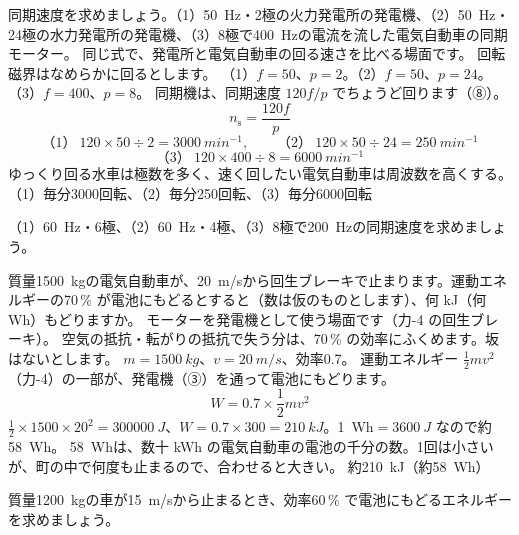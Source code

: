 \label{ph:電-12:ex10}
\begin{phreidai}
同期速度を求めましょう。（1）\qty{50}{Hz}・2極の火力発電所の発電機、（2）\qty{50}{Hz}・24極の水力発電所の発電機、（3）8極で\qty{400}{Hz}の電流を流した電気自動車の同期モーター。
\phbamen
同じ式で、発電所と電気自動車の回る速さを比べる場面です。
\phmushi
回転磁界はなめらかに回るとします。
\phzu
（1）$f=50$、$p=2$。（2）$f=50$、$p=24$。（3）$f=400$、$p=8$。
\phriyu
同期機は、同期速度 $120f/p$ でちょうど回ります（⑧）。
\phtateru
\[n_{\mathrm s}=\frac{120f}{p}\]
\phtoku
\[\text{（1）}\ 120\times50\div2=\qty{3000}{min^{-1}},\qquad\text{（2）}\ 120\times50\div24=\qty{250}{min^{-1}}\]
\[\text{（3）}\ 120\times400\div8=\qty{6000}{min^{-1}}\]
\phtashikame
ゆっくり回る水車は極数を多く、速く回したい電気自動車は周波数を高くする。
\kotae （1）毎分3000回転、（2）毎分250回転、（3）毎分6000回転
\end{phreidai}
\begin{jibun}
（1）\qty{60}{Hz}・6極、（2）\qty{60}{Hz}・4極、（3）8極で\qty{200}{Hz}の同期速度を求めましょう。
\end{jibun}

\label{ph:電-12:ex11}
\begin{phreidai}[回生ブレーキで電池にもどす]
質量\qty{1500}{kg}の電気自動車が、\qty{20}{m/s}から回生ブレーキで止まります。運動エネルギーの70\,\% が電池にもどるとすると（数は仮のものとします）、何 kJ（何 Wh）もどりますか。
\phbamen
モーターを発電機として使う場面です（力-4 の回生ブレーキ）。
\phmushi
空気の抵抗・転がりの抵抗で失う分は、70\,\% の効率にふくめます。坂はないとします。
\phzu
$m=\qty{1500}{kg}$、$v=\qty{20}{m/s}$、効率0.7。
\phriyu
運動エネルギー $\tfrac12mv^2$（力-4）の一部が、発電機（③）を通って電池にもどります。
\phtateru
\[W=0.7\times\frac12mv^2\]
\phtoku
$\tfrac12\times1500\times20^2=\qty{300000}{J}$、$W=0.7\times300=\qty{210}{kJ}$。\qty{1}{Wh}$=\qty{3600}{J}$ なので約\qty{58}{Wh}。
\phtashikame
\qty{58}{Wh}は、数十 kWh の電気自動車の電池の千分の数。1回は小さいが、町の中で何度も止まるので、合わせると大きい。
\kotae 約\qty{210}{kJ}（約\qty{58}{Wh}）
\end{phreidai}
\begin{jibun}
質量\qty{1200}{kg}の車が\qty{15}{m/s}から止まるとき、効率60\,\% で電池にもどるエネルギーを求めましょう。
\end{jibun}

